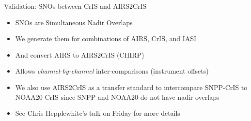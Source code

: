 \documentclass[10pt,t]{beamer}
\begin{document}
\begin{frame}[label={sec:org951fbfe}]{Validation: SNOs between CrIS and AIRS2CrIS}
\begin{itemize}
\item SNOs are Simultaneous Nadir Overlaps
\item We generate them for combinations of AIRS, CrIS, and IASI
\item And convert AIRS to AIRS2CrIS (CHIRP)
\item Allows \emph{channel-by-channel} inter-comparisons (instrument offsets)
\item We also use AIRS2CrIS as a transfer standard to intercompare SNPP-CrIS to NOAA20-CrIS since SNPP and NOAA20 do not have nadir overlaps
\item See Chris Hepplewhite's talk on Friday for more details
\end{itemize}
\end{frame}
\end{document}
